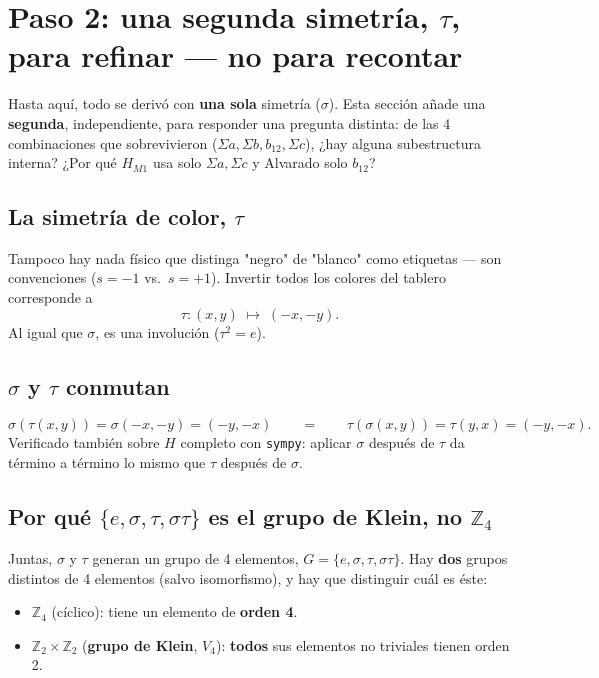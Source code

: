 \documentclass[11pt, a4paper]{article}
\begin{document}
\section{Paso 2: una segunda simetr\'ia, $\tau$, para refinar --- no para recontar}
\label{sec:tau}

Hasta aqu\'i, todo se deriv\'o con \textbf{una sola} simetr\'ia
($\sigma$). Esta secci\'on a\~nade una \textbf{segunda}, independiente,
para responder una pregunta distinta: de las 4 combinaciones que
sobrevivieron ($\Sigma a,\Sigma b,b_{12},\Sigma c$), ¿hay alguna
subestructura interna? ¿Por qu\'e $H_{M1}$ usa solo $\Sigma a,\Sigma c$
y Alvarado solo $b_{12}$?

\subsection{La simetr\'ia de color, $\tau$}

Tampoco hay nada f\'isico que distinga "negro" de "blanco" como
etiquetas --- son convenciones ($s=-1$ vs.\ $s=+1$). Invertir todos los
colores del tablero corresponde a
\[
\tau: (x,y) \;\longmapsto\; (-x,-y).
\]
Al igual que $\sigma$, es una involuci\'on ($\tau^2=e$).

\subsection{$\sigma$ y $\tau$ conmutan}

\[
\sigma(\tau(x,y)) = \sigma(-x,-y) = (-y,-x)
\qquad = \qquad
\tau(\sigma(x,y)) = \tau(y,x) = (-y,-x).
\]
Verificado tambi\'en sobre $H$ completo con \texttt{sympy}: aplicar
$\sigma$ despu\'es de $\tau$ da t\'ermino a t\'ermino lo mismo que
$\tau$ despu\'es de $\sigma$.

\subsection{Por qu\'e $\{e,\sigma,\tau,\sigma\tau\}$ es el grupo de Klein, no $\mathbb{Z}_4$}
\label{sec:klein}

Juntas, $\sigma$ y $\tau$ generan un grupo de 4 elementos,
$G=\{e,\sigma,\tau,\sigma\tau\}$. Hay \textbf{dos} grupos distintos de
4 elementos (salvo isomorfismo), y hay que distinguir cu\'al es \'este:

\begin{itemize}
  \item $\mathbb{Z}_4$ (c\'iclico): tiene un elemento de \textbf{orden 4}.
  \item $\mathbb{Z}_2\times\mathbb{Z}_2$ (\textbf{grupo de Klein}, $V_4$):
        \textbf{todos} sus elementos no triviales tienen orden 2.
\end{itemize}
\end{document}
